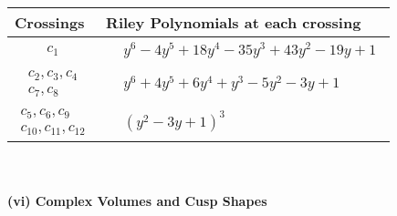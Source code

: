 \documentclass[1p]{elsarticle_modified}
\theoremstyle{definition}
\begin{document}
\begin{tabular}{m{50pt}|m{274pt}}
Crossings & \hspace{64pt}Riley Polynomials at each crossing \\
\hline $$\begin{aligned}c_{1}\end{aligned}$$&$\begin{aligned}
&y^6-4 y^5+18 y^4-35 y^3+43 y^2-19 y+1
\end{aligned}$\\
\hline $$\begin{aligned}c_{2},c_{3},c_{4}\\c_{7},c_{8}\end{aligned}$$&$\begin{aligned}
&y^6+4 y^5+6 y^4+y^3-5 y^2-3 y+1
\end{aligned}$\\
\hline $$\begin{aligned}c_{5},c_{6},c_{9}\\c_{10},c_{11},c_{12}\end{aligned}$$&$\begin{aligned}
&(y^2-3 y+1)^3
\end{aligned}$\\
\hline
\end{tabular}\\~\\
\newpage\flushleft \textbf{(vi) Complex Volumes and Cusp Shapes}
\end{document}
